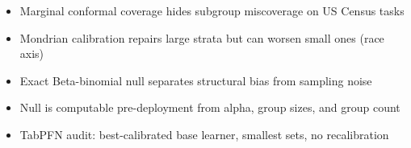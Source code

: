 \begin{itemize}
\item Marginal conformal coverage hides subgroup miscoverage on US Census tasks
\item Mondrian calibration repairs large strata but can worsen small ones (race axis)
\item Exact Beta-binomial null separates structural bias from sampling noise
\item Null is computable pre-deployment from alpha, group sizes, and group count
\item TabPFN audit: best-calibrated base learner, smallest sets, no recalibration
\end{itemize}
